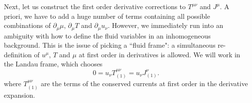 \documentclass[10pt, oneside]{book}
\begin{document}
\begin{doublespace}
Next, let us construct the first order derivative corrections to $T^{\mu\nu}$ and $J^\mu$.   A priori, we have to add a huge number of terms containing all possible combinations of $\partial_\mu \mu$, $\partial_\mu T$ and $\partial_\mu u_\nu$.   However, we immediately run into an ambiguity with how to define the fluid variables in an inhomogeneous background.   This is the issue of picking a ``fluid frame":   a simultaneous re-definition of $u^\mu$, $T$ and $\mu$ at first order in derivatives is allowed.   We will work in the Landau frame, which chooses \begin{equation}
0 = u_\nu T_{(1)}^{\mu\nu} = u_\nu J_{(1)}^\nu.
\end{equation}
where $T_{(1)}^{\mu\nu}$ are the terms of the conserved currents at first order in the derivative expansion.     


\end{doublespace}
\end{document}
